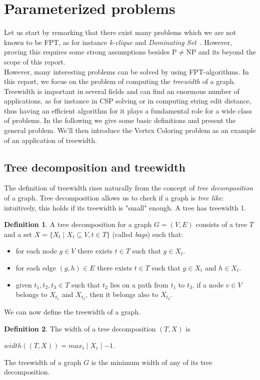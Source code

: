 \documentclass{article}
\theoremstyle{definition}
\newtheorem{definition}{Definition}[section]
\theoremstyle{lemma}
\theoremstyle{corollary}
\theoremstyle{theorem}
\begin{document}
\section{Parameterized problems}
Let us start by remarking that there exist many problems which we are not known to be FPT, as for instance \emph{k-clique} and \emph{Dominating Set}~\cite{kclique}. However, proving this requires some strong assumptions besides P$\not =$NP and its beyond the scope of this report.  \\
However, many interesting problems can be solved by using FPT-algorithms. In this report, we focus on the problem of computing the \emph{treewidth} of a graph. \\
Treewidth is important in several fields and can find an enormous number of applications, as for instance in CSP solving or in computing string edit distance, thus having an efficient algorithm for it plays a fundamental role for a wide class of problems. In the following we give some basic definitions and present the general problem. We'll then introduce the Vertex Coloring problem as an example of an application of treewidth.

\subsection{Tree decomposition and treewidth}
The definition of treewidth rises naturally from the concept of \emph{tree decomposition} of a graph. Tree decomposition allows us to check if a graph is \emph{tree like}: intuitively, this holds if its treewidth is "small" enough. A tree has treewidth 1.
\theoremstyle{definition}
\begin{definition}
	A tree decomposition for a graph $G = (V, E)$ consists of a tree $T$ and a set
	$X = \{ X_t \mid X_t \subseteq V, t \in T \}$ (called \emph{bags}) such that:
	\begin{itemize}
		\item for each node $g \in V$ there exists $t \in T$ such that $g \in X_t$.
		\item for each edge $(g,h) \in E$ there exists $t \in T$ such that $g \in X_t$
		and $h \in X_t$.
		\item given $t_1, t_2, t_3 \in T$ such that $t_2$ lies on a path from $t_1$ to
		$t_3$, if a node $v \in V$ belongs to $X_{t_1}$ and $X_{t_3}$, then it belongs also
		to $X_{t_2}$.
	\end{itemize}
\end{definition}
We can now define the treewidth of a graph.
\theoremstyle{definition}
\begin{definition}
	The width of a tree decomposition $(T, X)$ is
	\begin{center}
		$width((T,X)) = max_t \mid X_t \mid -1$.
	\end{center}
	The treewidth of a graph $G$ is the minimum width of any of its tree decomposition.
\end{definition}
\end{document}

